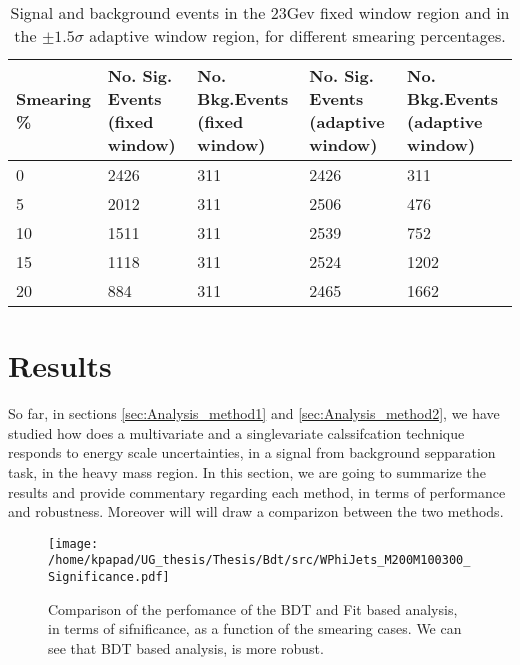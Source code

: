 \begin{table}[h!]
\centering
\begin{tabular}{|p{2cm}|p{3cm}|p{3cm}|p{3cm}|p{3cm}|}
 \hline
Smearing \%  & No. Sig. Events (fixed window) & No. Bkg.Events (fixed window) & No. Sig. Events (adaptive window) & No. Bkg.Events (adaptive window)  \\
\hline
0 & 2426 & 311 & 2426 & 311 \\
5 & 2012 & 311 & 2506 & 476 \\
10 & 1511 & 311 & 2539 & 752 \\
15 & 1118 & 311 & 2524 & 1202 \\
20 & 884 & 311 & 2465 & 1662 \\
 \hline
\end{tabular}
\caption{Signal and background events in the 23Gev fixed window region and in the $\pm 1.5\sigma$ adaptive window region, for different smearing percentages.}
\label{table:NumSigBkg}
\end{table}

\section{Results}
\label{sec:orgacc4269}
So far, in sections \ref{sec:Analysis_method1} and \ref{sec:Analysis_method2}, we have studied how does a multivariate and a singlevariate calssifcation technique responds to energy scale uncertainties, in a signal from background sepparation task, in the heavy mass region. In this section, we are going to summarize the results and provide commentary regarding each method, in terms of performance and robustness. Moreover will will draw a comparizon between the two methods.

\begin{figure}[h!]
\centering
\texttt{[image: /home/kpapad/UG\_thesis/Thesis/Bdt/src/WPhiJets\_M200M100300\_Significance.pdf]}
\caption{ Comparison of the perfomance of the BDT and Fit based analysis, in terms of sifnificance,  as a function of the smearing cases. We can see that BDT based analysis, is more robust.}
\label{fig:BdtFitSig}
\end{figure}

